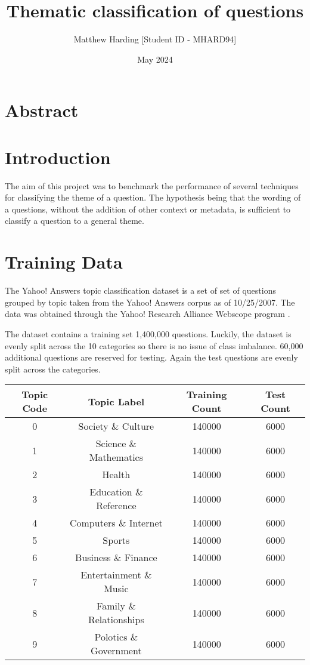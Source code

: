 \documentclass{article}
\title{Thematic classification of questions}
\author{Matthew Harding [Student ID - MHARD94]}
\date{May 2024}
\begin{document}
\maketitle

\section{Abstract}


\section{Introduction}

The aim of this project was to benchmark the performance of several techniques for classifying the theme of a question. The hypothesis being that 
the wording of a questions, without the addition of other context or metadata, is sufficient to classify a question to a general theme.
 

\section{Training Data}

The Yahoo! Answers topic classification dataset \cite{huggingface_dataset} is a set of set of questions grouped by topic taken from the Yahoo! Answers corpus as of 10/25/2007.
The data was obtained through the Yahoo! Research Alliance Webscope program \cite{yahoo_webscope}.


The dataset contains a training set 1,400,000 questions. Luckily, the dataset is evenly split across the 10 categories so there is no issue of class imbalance. 
60,000 additional questions are reserved for testing. Again the test questions are evenly split across the categories. 

\begin{center}
    \begin{tabular}{||c c c c||} 
     \hline
     Topic Code & Topic Label & Training Count & Test Count \\ [0.5ex] 
     \hline\hline
     0 & Society \& Culture & 140000 & 6000 \\ 
     \hline
     1 & Science \& Mathematics & 140000 & 6000 \\ 
     \hline
     2 & Health & 140000 & 6000 \\
     \hline
     3 & Education \& Reference & 140000 & 6000 \\
     \hline
     4 & Computers \& Internet & 140000 & 6000 \\
     \hline
     5 & Sports & 140000 & 6000 \\ 
     \hline
     6 & Business \& Finance & 140000 & 6000 \\ 
     \hline
     7 & Entertainment \& Music & 140000 & 6000 \\
     \hline
     8 & Family \& Relationships & 140000 & 6000 \\
     \hline
     9 & Polotics \& Government & 140000 & 6000 \\ [1ex] 
     \hline
    \end{tabular}
    \end{center}
\end{document}
